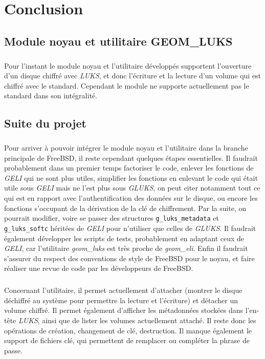 \chapter{Conclusion}
\section{Module noyau et utilitaire GEOM\_LUKS}

\paragraph{}
Pour l'instant le module noyau et l'utilitaire développés supportent l'ouverture
d'un disque chiffré avec {\em LUKS}, et donc l'écriture et la lecture d'un
volume qui est chiffré avec le standard. Cependant le module ne supporte
actuellement pas le standard dans son intégralité.


\section{Suite du projet}
\paragraph{}
Pour arriver à pouvoir intégrer le module noyau et l'utilitaire dans la branche
principale de FreeBSD, il reste cependant quelques étapes essentielles. Il
faudrait probablement dans un premier temps factoriser le code, enlever les
fonctions de {\em GELI} qui ne sont plus utiles, simplifier les fonctions en
enlevant le code qui était utile sous {\em GELI} mais ne l'est plus sous
{\em GLUKS}, on peut citer notamment tout ce qui est en rapport avec
l'authentification des données sur le disque, ou encore les fonctions s'occupant
de la dérivation de la clé de chiffrement. Par la suite, on pourrait modifier,
voire se passer des structures \texttt{g\_luks\_metadata} et
\texttt{g\_luks\_softc} héritées de {\em GELI} pour n'utiliser que celles de
{\em GLUKS}. Il faudrait également développer les scripts de tests, probablement
en adaptant ceux de {\em   GELI}, car l'utilitaire {\em geom\_luks} est très
proche de {\em geom\_eli}. Enfin il faudrait s'assurer du respect des
conventions de style de FreeBSD pour le noyau, et faire réaliser une revue de
code par les développeurs de FreeBSD.

\paragraph{}
Concernant l'utilitaire, il permet actuellement d'attacher (montrer le disque 
déchiffré au système pour permettre la lecture et l'écriture) et détacher un
volume chiffré. Il permet
également d'afficher les métadonnées stockées dans l'en-tête {\em LUKS}, ainsi que de
lister les volumes actuellement attaché. Il reste donc les opérations de
création, changement de clé, destruction. Il manque également le support de 
fichiers clé, qui permettent de remplacer ou compléter la phrase de passe.

